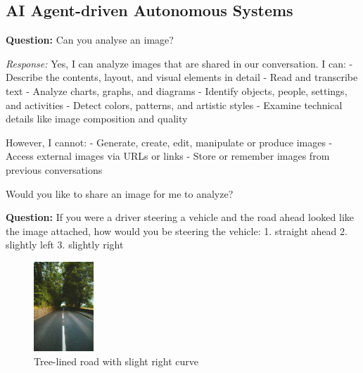 

\subsection{AI Agent-driven Autonomous Systems}

\textbf{Question:} Can you analyse an image?

\textit{Response:} Yes, I can analyze images that are shared in our conversation. I can:
- Describe the contents, layout, and visual elements in detail
- Read and transcribe text
- Analyze charts, graphs, and diagrams
- Identify objects, people, settings, and activities
- Detect colors, patterns, and artistic styles
- Examine technical details like image composition and quality

However, I cannot:
- Generate, create, edit, manipulate or produce images
- Access external images via URLs or links
- Store or remember images from previous conversations

Would you like to share an image for me to analyze?

\textbf{Question:} If you were a driver steering a vehicle and the road ahead looked like the image attached, how would you be steering the vehicle: 1. straight ahead 2. slightly left 3. slightly right

\begin{figure}[h]
\centering
\includegraphics[width=0.2\textwidth]{Figures/Methods-03-04/tree_tunnel_road.jpeg}
\caption{Tree-lined road with slight right curve}
\label{fig:road1}
\end{figure}

